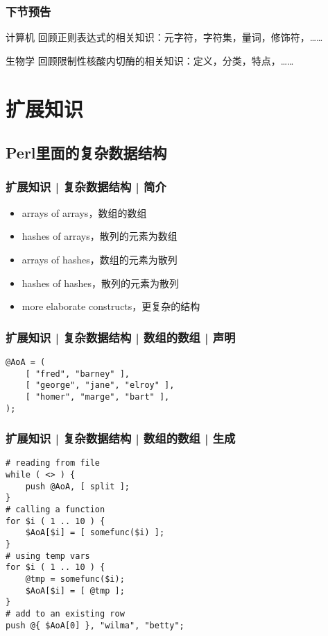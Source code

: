 \begin{frame}
  \frametitle{下节预告}
  \begin{block}{计算机}
    回顾正则表达式的相关知识：元字符，字符集，量词，修饰符，……
  \end{block}
  \begin{block}{生物学}
    回顾限制性核酸内切酶的相关知识：定义，分类，特点，……
  \end{block}
\end{frame}

\section{扩展知识}
\subsection{Perl里面的复杂数据结构}
\begin{frame}
  \frametitle{扩展知识 | 复杂数据结构 | 简介}
  \begin{itemize}
    \item arrays of arrays，数组的数组
    \item hashes of arrays，散列的元素为数组
    \item arrays of hashes，数组的元素为散列
    \item hashes of hashes，散列的元素为散列
    \item more elaborate constructs，更复杂的结构
  \end{itemize}
\end{frame}

\begin{frame}[fragile]
  \frametitle{扩展知识 | 复杂数据结构 | 数组的数组 | 声明}
\begin{lstlisting}
@AoA = (
    [ "fred", "barney" ],
    [ "george", "jane", "elroy" ],
    [ "homer", "marge", "bart" ],
);
\end{lstlisting}
\end{frame}

\begin{frame}[fragile]
  \frametitle{扩展知识 | 复杂数据结构 | 数组的数组 | 生成}
\begin{lstlisting}
# reading from file
while ( <> ) {
    push @AoA, [ split ];
}
# calling a function
for $i ( 1 .. 10 ) {
    $AoA[$i] = [ somefunc($i) ];
}
# using temp vars
for $i ( 1 .. 10 ) {
    @tmp = somefunc($i);
    $AoA[$i] = [ @tmp ];
}
# add to an existing row
push @{ $AoA[0] }, "wilma", "betty";
\end{lstlisting}
\end{frame}

